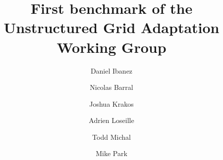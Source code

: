 \documentclass[3p,times,procedia,number]{elsarticle}
\begin{document}
\begin{frontmatter}




\title{First benchmark of the Unstructured Grid Adaptation Working Group}


\author[a]{Daniel Ibanez}
\author[b]{Nicolas Barral}
\author[c]{Joshua Krakos}
\author[d]{Adrien Loseille}
\author[c]{Todd Michal}
\author[e]{Mike Park}

\address[a]{Sandia National Laboratories, P.O. Box 5800, Albuquerque, NM 87185-1321, United States}
\address[b]{Department of Earth Science and Engineering, Imperial College London, South Kensington Campus, London SW7 2AZ, United Kingdom}
\address[c]{The Boeing Company, St.~Louis, MO, United States}
\address[d]{INRIA Saclay-\^ile-de-France, B\^atiment Alan Turing, 91120 Palaiseau, France}
\address[e]{NASA Langley Research Center, Mail Stop 128, Hampton, VA 23681, United States}


\end{frontmatter}
\end{document}
